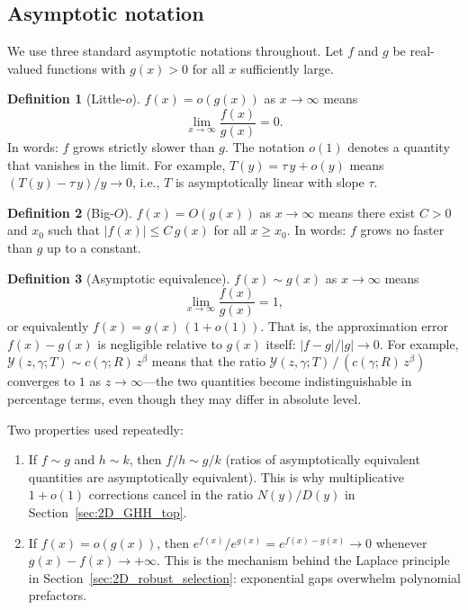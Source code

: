 \documentclass[12pt,a4paper]{article}
\theoremstyle{definition}
\newtheorem{definition}{Definition}[section]
\theoremstyle{plain}
\theoremstyle{remark}
\newcommand{\calY}{\mathcal{Y}}
\begin{document}
\subsection{Asymptotic notation}
\label{app:asymptotic_notation}

We use three standard asymptotic notations throughout.
Let $f$ and $g$ be real-valued functions with $g(x) > 0$
for all $x$ sufficiently large.

\begin{definition}[Little-$o$]
$f(x) = o(g(x))$ as $x \to \infty$ means
\[
  \lim_{x \to \infty} \frac{f(x)}{g(x)} = 0.
\]
In words: $f$ grows strictly slower than $g$.  The
notation $o(1)$ denotes a quantity that vanishes in the
limit.  For example, $T(y) = \tau\,y + o(y)$ means
$(T(y) - \tau\,y)/y \to 0$, i.e., $T$ is asymptotically
linear with slope $\tau$.
\end{definition}

\begin{definition}[Big-$O$]
$f(x) = O(g(x))$ as $x \to \infty$ means there exist
$C > 0$ and $x_0$ such that $|f(x)| \leq C\,g(x)$ for
all $x \geq x_0$.  In words: $f$ grows no faster than $g$
up to a constant.
\end{definition}
\begin{definition}[Asymptotic equivalence]
  $f(x) \sim g(x)$ as $x \to \infty$ means
  \[
    \lim_{x \to \infty} \frac{f(x)}{g(x)} = 1,
  \]
  or equivalently $f(x) = g(x)\,(1 + o(1))$.  That is,
  the approximation error $f(x) - g(x)$ is negligible
  relative to $g(x)$ itself: $|f - g|/|g| \to 0$.
  For example,
  $\calY(z,\gamma;T) \sim c(\gamma;R)\,z^{\beta}$ means
  that the ratio $\calY(z,\gamma;T)\,/\,(c(\gamma;R)\,z^{\beta})$
  converges to $1$ as $z \to \infty$---the two quantities
  become indistinguishable in percentage terms, even though
  they may differ in absolute level.
  \end{definition}
  
Two properties used repeatedly:
\begin{enumerate}[label=(\roman*)]
  \item If $f \sim g$ and $h \sim k$, then $f/h \sim g/k$
    (ratios of asymptotically equivalent quantities are
    asymptotically equivalent).  This is why
    multiplicative $1 + o(1)$ corrections cancel in the
    ratio $N(y)/D(y)$ in Section~\ref{sec:2D_GHH_top}.
  \item If $f(x) = o(g(x))$, then $e^{f(x)}/e^{g(x)}
    = e^{f(x)-g(x)} \to 0$ whenever $g(x) - f(x) \to
    +\infty$.  This is the mechanism behind the Laplace
    principle in Section~\ref{sec:2D_robust_selection}:
    exponential gaps overwhelm polynomial prefactors.
\end{enumerate}
%
\end{document}
